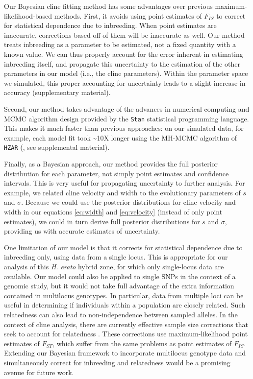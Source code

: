\documentclass[]{article}
\begin{document}
Our Bayesian cline fitting method has some advantages over previous
maximum-likelihood-based methods. First, it avoids using point estimates
of \(F_{IS}\) to correct for statistical dependence due to inbreeding.
When point estimates are inaccurate, corrections based off of them will
be inaccurate as well. Our method treats inbreeding as a parameter to be
estimated, not a fixed quantity with a known value. We can thus properly
account for the error inherent in estimating inbreeding itself, and
propagate this uncertainty to the estimation of the other parameters in
our model (i.e., the cline parameters). Within the parameter space we
simulated, this proper accounting for uncertainty leads to a slight
increase in accuracy (supplementary material).

Second, our method takes advantage of the advances in numerical
computing and MCMC algorithm design provided by the \texttt{Stan}
statistical programming language. This makes it much faster than
previous approaches: on our simulated data, for example, each model fit
took \textasciitilde{}10X longer using the MH-MCMC algorithm of
\texttt{HZAR} (\citealt{Derryberry:2014jw}, see supplemental material).

Finally, as a Bayesian approach, our method provides the full posterior
distribution for each parameter, not simply point estimates and
confidence intervals. This is very useful for propagating uncertainty to
further analysis. For example, we related cline velocity and width to
the evolutionary parameters of \(s\) and \(\sigma\). Because we could
use the posterior distributions for cline velocity and width in our
equations \ref{eq:width} and \ref{eq:velocity} (instead of only point
estimates), we could in turn derive full posterior distributions for
\(s\) and \(\sigma\), providing us with accurate estimates of
uncertainty.

One limitation of our model is that it corrects for statistical
dependence due to inbreeding only, using data from a single locus. This
is appropriate for our analysis of this \textit{H. erato} hybrid zone,
for which only single-locus data are available. Our model could also be
applied to single SNPs in the context of a genomic study, but it would
not take full advantage of the extra information contained in multilocus
genotypes. In particular, data from multiple loci can be useful in
determining if individuals within a population are closely related. Such
relatedness can also lead to non-independence between sampled alleles.
In the context of cline analysis, there are currently effective sample
size corrections that seek to account for relatedness
\citep[e.g.,][]{Macholan:2008gg}. These corrections use
maximum-likelihood point estimates of \(F_{ST}\), which suffer from the
same problems as point estimates of \(F_{IS}\). Extending our Bayesian
framework to incorporate multilocus genotype data and simultaneously
correct for inbreeding and relatedness would be a promising avenue for
future work.
\end{document}
